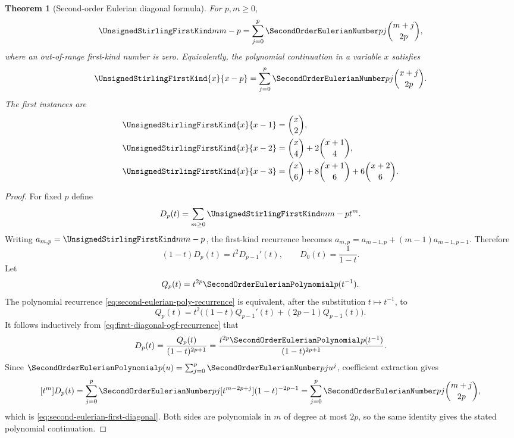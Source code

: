 \documentclass[11pt,a4paper,oneside,openany]{book}
\newtheorem{theorem}{Theorem}[chapter]
\theoremstyle{definition}
\theoremstyle{remark}
\begin{document}
\begin{theorem}[Second-order Eulerian diagonal formula]
\label{thm:second-eulerian-first-diagonal}
For $p,m\ge0$,
\begin{equation}
\label{eq:second-eulerian-first-diagonal}
 \UnsignedStirlingFirstKind m{m-p}
 =\sum_{j=0}^{p}\SecondOrderEulerianNumber pj\binom{m+j}{2p},
\end{equation}
where an out-of-range first-kind number is zero.  Equivalently, the polynomial
continuation in a variable $x$ satisfies
\[
 \UnsignedStirlingFirstKind{x}{x-p}
 =\sum_{j=0}^{p}\SecondOrderEulerianNumber pj\binom{x+j}{2p}.
\]
The first instances are
\begin{align*}
 \UnsignedStirlingFirstKind{x}{x-1}&=\binom{x}{2},\\
 \UnsignedStirlingFirstKind{x}{x-2}&=\binom{x}{4}+2\binom{x+1}{4},\\
 \UnsignedStirlingFirstKind{x}{x-3}&=\binom{x}{6}+8\binom{x+1}{6}
                    +6\binom{x+2}{6}.
\end{align*}
\end{theorem}
\begin{proof}
For fixed $p$ define
\[
 D_p(t)=\sum_{m\ge0}\UnsignedStirlingFirstKind m{m-p}t^m.
\]
Writing $a_{m,p}=\UnsignedStirlingFirstKind m{m-p}$, the first-kind recurrence becomes
$a_{m,p}=a_{m-1,p}+(m-1)a_{m-1,p-1}$.  Therefore
\begin{equation}
\label{eq:first-diagonal-ogf-recurrence}
 (1-t)D_p(t)=t^2D_{p-1}'(t),
 \qquad D_0(t)=\frac1{1-t}.
\end{equation}
Let
\[
 Q_p(t)=t^{2p}\SecondOrderEulerianPolynomial p(t^{-1}).
\]
The polynomial recurrence \eqref{eq:second-eulerian-poly-recurrence} is equivalent,
after the substitution $t\mapsto t^{-1}$, to
\[
 Q_p(t)=t^2\bigl((1-t)Q_{p-1}'(t)+(2p-1)Q_{p-1}(t)\bigr).
\]
It follows inductively from \eqref{eq:first-diagonal-ogf-recurrence} that
\begin{equation}
\label{eq:first-diagonal-second-eulerian-ogf}
 D_p(t)=\frac{Q_p(t)}{(1-t)^{2p+1}}
 =\frac{t^{2p}\SecondOrderEulerianPolynomial p(t^{-1})}{(1-t)^{2p+1}}.
\end{equation}
Since $\SecondOrderEulerianPolynomial p(u)=\sum_{j=0}^{p}\SecondOrderEulerianNumber pj u^j$, coefficient extraction gives
\[
 [t^m]D_p(t)
 =\sum_{j=0}^{p}\SecondOrderEulerianNumber pj
   [t^{m-2p+j}](1-t)^{-2p-1}
 =\sum_{j=0}^{p}\SecondOrderEulerianNumber pj\binom{m+j}{2p},
\]
which is \eqref{eq:second-eulerian-first-diagonal}.  Both sides are polynomials in
$m$ of degree at most $2p$, so the same identity gives the stated polynomial
continuation.
\end{proof}
\end{document}
